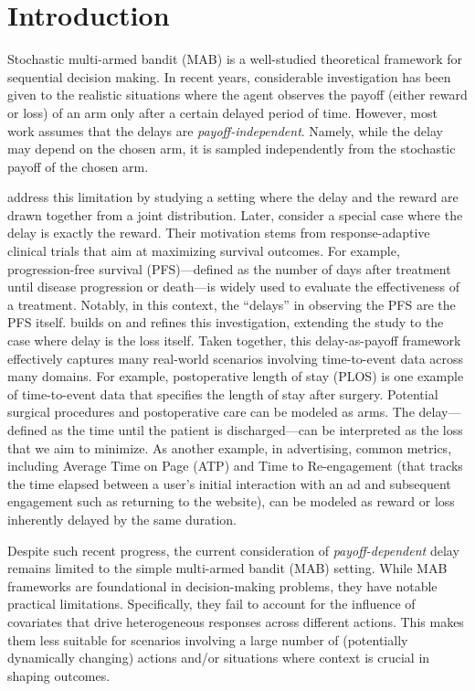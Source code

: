 \section{Introduction}\label{sec: intro}
Stochastic multi-armed bandit (MAB)  is a well-studied theoretical framework for sequential decision making. In recent years, considerable investigation has been given to the realistic situations where the agent observes the payoff (either reward or loss) of an arm
only after a certain delayed period of time. However, most work assumes that the delays are {\it payoff-independent}. Namely, while the delay may depend on the chosen arm, it is sampled independently from the stochastic payoff of the chosen arm.

\citet{lancewicki2021stochastic} address this limitation by studying a setting where the delay and the reward are drawn together from a joint distribution.  
Later, \citet{tang2024stochastic} consider a special case where the delay is exactly the reward. Their motivation stems from response-adaptive clinical trials that aim at maximizing survival outcomes. For example, progression-free survival (PFS)—defined as the number of days after treatment until disease progression or death—is widely used to evaluate the effectiveness of a treatment. Notably, in this context, the ``delays'' in observing the PFS are the PFS itself. \citet{schlisselberg2024delay}  builds on and refines this investigation,  extending the study to the case where delay is the loss itself. Taken together, this delay-as-payoff framework effectively captures many real-world scenarios involving time-to-event data across many domains. For example, postoperative length of stay (PLOS) is one example of time-to-event data that  specifies the length of stay after surgery. Potential surgical procedures and postoperative care can be modeled as arms.  The delay—defined as the time until the patient is discharged—can be interpreted as the loss that we aim to minimize. 
As another example, in advertising, common metrics, including Average Time on Page (ATP) and Time to Re-engagement (that
tracks the time elapsed between a user’s initial interaction with an ad and subsequent engagement such as returning to the website), can be modeled as reward or loss inherently delayed by the same duration.

Despite such recent progress, the current consideration of {\it payoff-dependent} delay remains limited to the simple multi-armed bandit (MAB) setting. While MAB frameworks are foundational in decision-making problems, they have notable practical limitations. Specifically, they fail to account for the influence of covariates that drive heterogeneous responses across different actions. This makes them less suitable for scenarios involving a large number of  (potentially dynamically changing) actions and/or situations where context is crucial in shaping outcomes.


